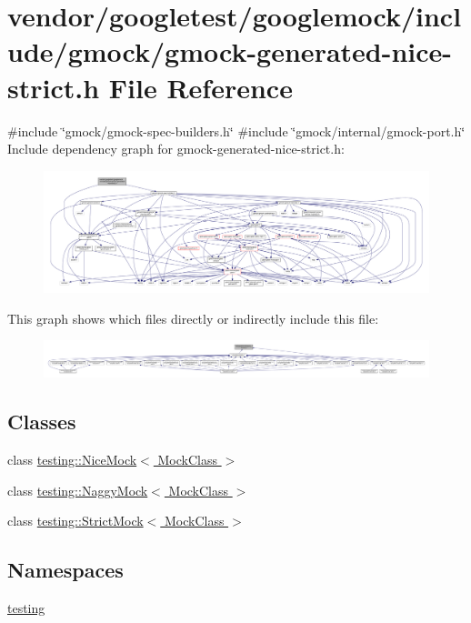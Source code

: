 \hypertarget{gmock-generated-nice-strict_8h}{}\section{vendor/googletest/googlemock/include/gmock/gmock-\/generated-\/nice-\/strict.h File Reference}
\label{gmock-generated-nice-strict_8h}
{\ttfamily \#include \char`\"{}gmock/gmock-\/spec-\/builders.\+h\char`\"{}}\newline
{\ttfamily \#include \char`\"{}gmock/internal/gmock-\/port.\+h\char`\"{}}\newline
Include dependency graph for gmock-\/generated-\/nice-\/strict.h\+:
\nopagebreak
\begin{figure}[H]
\begin{center}
\leavevmode
\includegraphics[width=350pt]{gmock-generated-nice-strict_8h__incl}
\end{center}
\end{figure}
This graph shows which files directly or indirectly include this file\+:
\nopagebreak
\begin{figure}[H]
\begin{center}
\leavevmode
\includegraphics[width=350pt]{gmock-generated-nice-strict_8h__dep__incl}
\end{center}
\end{figure}
\subsection*{Classes}
\begin{DoxyCompactItemize}
\item 
class \hyperlink{classtesting_1_1_nice_mock}{testing\+::\+Nice\+Mock$<$ Mock\+Class $>$}
\item 
class \hyperlink{classtesting_1_1_naggy_mock}{testing\+::\+Naggy\+Mock$<$ Mock\+Class $>$}
\item 
class \hyperlink{classtesting_1_1_strict_mock}{testing\+::\+Strict\+Mock$<$ Mock\+Class $>$}
\end{DoxyCompactItemize}
\subsection*{Namespaces}
\begin{DoxyCompactItemize}
\item 
 \hyperlink{namespacetesting}{testing}
\end{DoxyCompactItemize}
